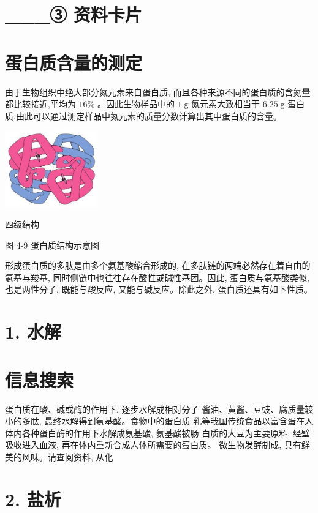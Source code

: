 \documentclass[10pt]{article}
\begin{document}
\section*{\_\_\_③ 资料卡片}

\section*{蛋白质含量的测定}

由于生物组织中绝大部分氮元素来自蛋白质, 而且各种来源不同的蛋白质的含氮量都比较接近,平均为 \({16}\%\) 。因此生物样品中的 \(1\mathrm{\;g}\) 氮元素大致相当于 \({6.25}\mathrm{\;g}\) 蛋白质,由此可以通过测定样品中氮元素的质量分数计算出其中蛋白质的含量。

\begin{center}
\includegraphics[max width=0.3\textwidth]{images/0190efc5-b58a-7c43-bfb0-e0a030df9cfd_120_336048.jpg}
\end{center}

四级结构

图 4-9 蛋白质结构示意图

形成蛋白质的多肽是由多个氨基酸缩合形成的, 在多肽链的两端必然存在着自由的氨基与羧基, 同时侧链中也往往存在酸性或碱性基团。因此, 蛋白质与氨基酸类似, 也是两性分子, 既能与酸反应, 又能与碱反应。除此之外, 蛋白质还具有如下性质。

\section*{1. 水解}

\section*{信息搜索}

蛋白质在酸、碱或酶的作用下, 逐步水解成相对分子 酱油、黄酱、豆豉、腐质量较小的多肽, 最终水解得到氨基酸。食物中的蛋白质 乳等我国传统食品以富含蛋在人体内各种蛋白酶的作用下水解成氨基酸, 氨基酸被肠 白质的大豆为主要原料, 经壁吸收进入血液, 再在体内重新合成人体所需要的蛋白质。 微生物发酵制成, 具有鲜美的风味。请查阅资料, 从化

\section*{2. 盐析}
\end{document}
